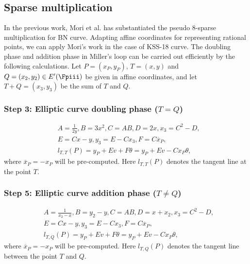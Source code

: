 \subsection{Sparse multiplication }
In the previous work, Mori et al. \cite{PAIRING:MANS13} has substantiated the pseudo 8-sparse multiplication for BN curve. 
Adapting affine coordinates for representing rational points, we can apply Mori's work in the case of KSS-18 curve. The doubling phase and addition phase in Miller's loop can be carried out efficiently by the following calculations. Let $P=(x_P,y_P)$, $T=(x,y)$ and $Q=(x_2,y_2)\in E'(\Fpiii)$ be given in affine coordinates, and let $T+Q=(x_3,y_3)$ be the sum of $T$ and $Q$.
\subsubsection{Step 3: Elliptic curve doubling phase \texorpdfstring{($T = Q$)}{}}
\begin{eqnarray}
&A=\frac{1}{2y}, B=3x^2, C=AB, D=2x, x_3=C^2-D,\nonumber\\
&E=Cx-y, y_3=E-Cx_3, F=C\overline{x}_P,\nonumber\\
&l_{T,T}(P)=y_P+Ev+F\theta=y_P+Ev-Cx_P\theta,\label{sparse_dbl}
\end{eqnarray}
where $\overline{x}_P=-x_P$ will be pre-computed. Here $l_{T,T}(P)$ denotes the tangent line at the point $T$.
\subsubsection{Step 5: Elliptic curve addition phase \texorpdfstring{($T\neq Q$)}{}}
\begin{eqnarray}
&A=\frac{1}{x_2-x}, B=y_2-y, C=AB, D=x+x_2, x_3=C^2-D,\nonumber\\
&E=Cx-y, y_3=E-Cx_3, F=C\overline{x}_P,\nonumber\\
&l_{T,Q}(P)=y_P+Ev+F\theta=y_P+Ev-Cx_P\theta,\label{sparse_add}
\end{eqnarray}
where $\overline{x}_P=-x_P$ will be pre-computed. Here $l_{T,Q}(P)$ denotes the tangent line between the point $T$ and $Q$.


